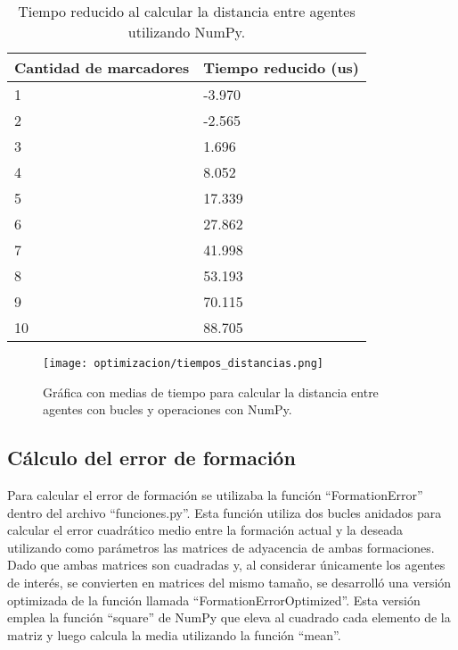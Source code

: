 \begin{table}[H]
	\centering
	\resizebox{0.5\textwidth}{!} {
	\begin{tabular}{|l|l|}
		\hline
		\textbf{Cantidad de marcadores} & \textbf{Tiempo reducido (us)} \\ \hline
		1                               & -3.970                        \\ \hline
		2                               & -2.565                        \\ \hline
		3                               & 1.696                         \\ \hline
		4                               & 8.052                         \\ \hline
		5                               & 17.339                        \\ \hline
		6                               & 27.862                        \\ \hline
		7                               & 41.998                        \\ \hline
		8                               & 53.193                        \\ \hline
		9                               & 70.115                        \\ \hline
		10                              & 88.705                        \\ \hline
	\end{tabular}}
	\caption{Tiempo reducido al calcular la distancia entre agentes utilizando NumPy.}
	\label{cuadro:tiempo_reducido_distancia}
\end{table}

\begin{figure}[H]
	\centering
	\texttt{[image: optimizacion/tiempos\_distancias.png]}
	\caption{Gráfica con medias de tiempo para calcular la distancia entre agentes con bucles y operaciones con NumPy.}
	\label{fig:grafica_tiempos_distancias}
\end{figure}

\subsection{Cálculo del error de formación}
Para calcular el error de formación se utilizaba la función ``FormationError'' dentro del archivo ``funciones.py''. Esta función utiliza dos bucles anidados para calcular el error cuadrático medio entre la formación actual y la deseada utilizando como parámetros las matrices de adyacencia de ambas formaciones. Dado que ambas matrices son cuadradas y, al considerar únicamente los agentes de interés, se convierten en matrices del mismo tamaño, se desarrolló una versión optimizada de la función llamada ``FormationErrorOptimized''. Esta versión emplea la función ``square'' de NumPy que eleva al cuadrado cada elemento de la matriz y luego calcula la media utilizando la función ``mean''.

